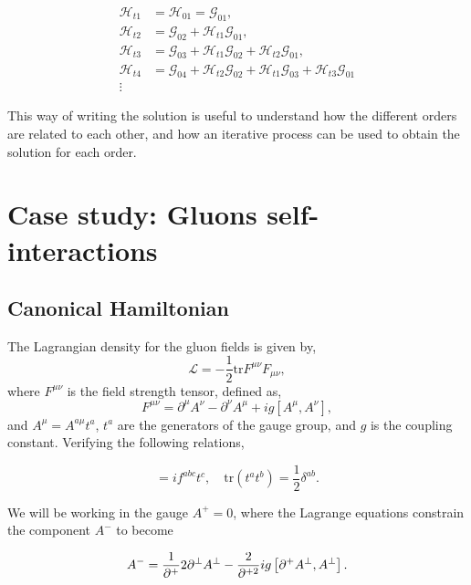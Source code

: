 \documentclass[11pt,a4paper,twoside,pdf]{article}
\numberwithin{equation}{section}
\begin{document}
\begin{align}
    \mathcal{H}_{t1} & = \mathcal{H}_{01} = \mathcal{G}_{01}, \\
    \mathcal{H}_{t2} & = \mathcal{G}_{02} + \mathcal{H}_{t1} \mathcal{G}_{01}, \\
    \mathcal{H}_{t3} & = \mathcal{G}_{03} + \mathcal{H}_{t1} \mathcal{G}_{02} + 
    \mathcal{H}_{t2} \mathcal{G}_{01}, \\
    \mathcal{H}_{t4} & = \mathcal{G}_{04} + \mathcal{H}_{t2} \mathcal{G}_{02} + 
    \mathcal{H}_{t1} \mathcal{G}_{03} + \mathcal{H}_{t3} \mathcal{G}_{01} \label{eq:sol_order4}\\
    \vdots & \nonumber
\end{align}

This way of writing the solution is useful to understand how the different
orders are related to each other, and how an iterative process can be used to
obtain the solution for each order.

\section{Case study: Gluons self-interactions} \label{sec:cases}

\subsection{Canonical Hamiltonian}

The Lagrangian density for the gluon fields is given by,
\begin{equation}
    \mathcal{L} = -\frac{1}{2}\text{tr}F^{\mu\nu}F_{\mu\nu},
\end{equation}
where $F^{\mu\nu}$ is the field strength tensor, defined as,
\begin{equation}
    F^{\mu\nu} = \partial^\mu A^\nu - \partial^\nu A^\mu + ig [A^\mu, A^\nu],
\end{equation}
and $A^\mu = A^{a\mu}t^a$, $t^a$ are the generators of the gauge group, and $g$ is the
coupling constant. Verifying the following relations,

\begin{equation}
    [t^a, t^b] = i f^{abc} t^c, \quad \text{tr}(t^a t^b) = \frac{1}{2} \delta^{ab}.
\end{equation}

We will be working in the gauge $A^+=0$, where the Lagrange equations constrain
the component $A^-$ to become 

\begin{equation}
    A^- = \frac{1}{\partial^+}2 \partial^\perp A^\perp - \frac{2}{\partial^{+2}} ig 
    \left[ \partial^+ A^\perp, A^\perp \right].
\end{equation}
\end{document}
